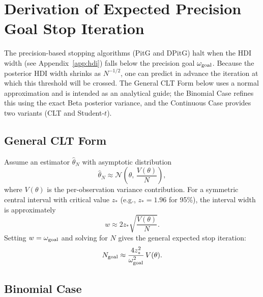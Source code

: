 \section{Derivation of Expected Precision Goal Stop Iteration}\label{app:expected_stop}

The precision-based stopping algorithms (PitG \citealt{kruschke2015doing} and DPitG) halt when the HDI width
(see Appendix~\ref{app:hdi})
falls below the precision goal $\omega_{\rm goal}$. Because the posterior HDI width
shrinks as $N^{-1/2}$, one can predict in advance the iteration at which this
threshold will be crossed. The General CLT Form below uses a normal approximation
and is intended as an analytical guide; the Binomial Case refines this using the
exact Beta posterior variance, and the Continuous Case provides two variants
(CLT and Student-$t$).

\subsection*{General CLT Form}

Assume an estimator $\hat\theta_N$ with asymptotic distribution
\begin{equation}\label{eq:clt_general}
\hat\theta_N \approx \mathcal{N}\!\left(\theta,\,\frac{V(\theta)}{N}\right),
\end{equation}
where $V(\theta)$ is the per-observation variance contribution. For a symmetric
central interval with critical value $z_{*}$ (e.g., $z_{*}=1.96$ for 95\%), the
interval width is approximately
\begin{equation}\label{eq:hdi_width_approx}
w \approx 2 z_{*}\sqrt{\frac{V(\theta)}{N}}.
\end{equation}
Setting $w = \omega_{\rm goal}$ and solving for $N$ gives the general expected stop
iteration:
\begin{equation}\label{eq:expected_stop_iteration_clt}
N_{\rm goal} \approx \frac{4 z_{*}^{2}}{\omega_{\rm goal}^{2}}\,V(\theta).
\end{equation}

\subsection*{Binomial Case}

